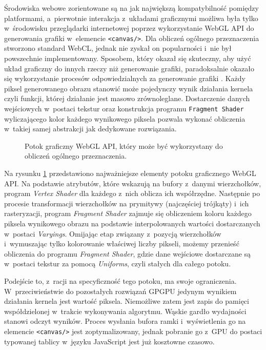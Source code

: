 Środowiska webowe zorientowane są na jak największą kompatybilność pomiędzy platformami, a~pierwotnie interakcja z~układami graficznymi możliwa była tylko w~środowisku przeglądarki internetowej poprzez wykorzystanie WebGL API do generowania grafiki w~elemencie \lstinline{<canvas/>}. Dla obliczeń ogólnego przeznaczenia stworzono standard WebCL, jednak nie zyskał on popularności i~nie był powszechnie implementowany. Sposobem, który okazał się skuteczny, aby użyć układ graficzny do innych rzeczy niż generowanie grafiki, paradoksalnie okazało się wykorzystanie procesów odpowiedzialnych za generowanie grafiki \cite{sapuan2018general}. Każdy piksel generowanego obrazu stanowić może pojedynczy wynik działania kernela czyli funkcji, której działanie jest masowo zrównoleglane. Dostarczenie danych wejściowych w~postaci tekstur oraz konstrukcja programu \texttt{Fragment Shader} wyliczającego kolor każdego wynikowego piksela pozwala wykonać obliczenia w~takiej samej abstrakcji jak dedykowane rozwiązania. 

\begin{figure}
    \centering
    
    \caption{Potok graficzny WebGL API, który może być wykorzystany do obliczeń ogólnego przeznaczenia.}
    \label{fig:webgl-pipeline}
\end{figure}

Na rysunku \ref{fig:webgl-pipeline} przedstawiono najważniejsze elementy potoku graficznego WebGL API. Na podstawie atrybutów, które wskazują na bufory z~danymi wierzchołków, program \textit{Vertex Shader} dla każdego z~nich oblicza ich współrzędne. Następnie po procesie transformacji wierzchołków na prymitywy (najczęściej trójkąty) i~ich rasteryzacji, program \textit{Fragment Shader} zajmuje się obliczeniem koloru każdego piksela wynikowego obrazu na podstawie interpolowanych wartości dostarczanych w~postaci \textit{Varyings}. Omijając etap związany z~pozycją wierzchołków i~wymuszając tylko kolorowanie właściwej liczby pikseli, możemy przenieść obliczenia do programu \textit{Fragment Shader}, gdzie dane wejściowe dostarczane są w~postaci tekstur za pomocą \textit{Uniforms}, czyli stałych dla całego potoku.

Podejście to, z~racji na specyficzność tego potoku, ma swoje ograniczenia. W~przeciwieństwie do pozostałych rozwiązań GPGPU jedynym wynikiem działania kernela jest wartość piksela. Niemożliwe zatem jest zapis do pamięci współdzielonej w~trakcie wykonywania algorytmu. Wąskie gardło wydajności stanowi odczyt wyników. Proces wysłania bufora ramki i~wyświetlenia go na elemencie \lstinline{<canvas/>} jest zoptymalizowany, jednak pobranie go z~GPU do postaci typowanej tablicy w~języku JavaScript jest już kosztowne czasowo.

